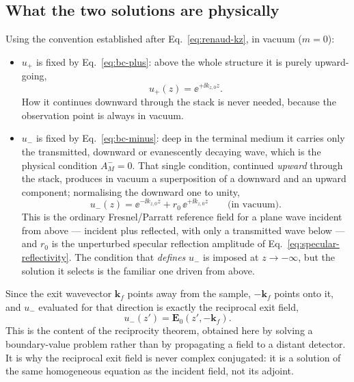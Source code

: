 \subsection{What the two solutions are physically}

Using the convention established after Eq.~\eqref{eq:renaud-kz}, in vacuum
($m=0$):
\begin{itemize}
  \item $u_+$ is fixed by Eq.~\eqref{eq:bc-plus}: above the whole structure it
        is purely upward-going,
        \begin{equation}
          u_+(z)=\ee^{+\ii k_{z,0}z}.
          \label{eq:u-plus}
        \end{equation}
        How it continues downward through the stack is never needed, because
        the observation point is always in vacuum.
  \item $u_-$ is fixed by Eq.~\eqref{eq:bc-minus}: deep in the terminal medium
        it carries only the transmitted, downward or evanescently decaying
        wave, which is the physical condition $A_M^-=0$.  That single condition,
        continued \emph{upward} through the stack, produces in vacuum a
        superposition of a downward and an upward component; normalising the
        downward one to unity,
        \begin{equation}
          u_-(z)=\ee^{-\ii k_{z,0}z}+r_0\,\ee^{+\ii k_{z,0}z}
          \qquad\text{(in vacuum)}.
          \label{eq:u-minus}
        \end{equation}
        This is the ordinary Fresnel/Parratt reference field for a plane wave
        incident from above --- incident plus reflected, with only a
        transmitted wave below --- and $r_0$ is the unperturbed specular
        reflection amplitude of Eq.~\eqref{eq:specular-reflectivity}.  The
        condition that \emph{defines} $u_-$ is imposed at $z\to-\infty$, but
        the solution it selects is the familiar one driven from above.
\end{itemize}
Since the exit wavevector $\bm k_f$ points away from the sample, $-\bm k_f$
points onto it, and $u_-$ evaluated for that direction is exactly the
reciprocal exit field,
\begin{equation}
  u_-(z')=\bm E_0(z',-\bm k_f).
  \label{eq:u-minus-identification}
\end{equation}
This is the content of the reciprocity theorem, obtained here by solving a
boundary-value problem rather than by propagating a field to a distant
detector.  It is why the reciprocal exit field is never complex conjugated:
it is a solution of the same homogeneous equation as the incident field, not
its adjoint.

